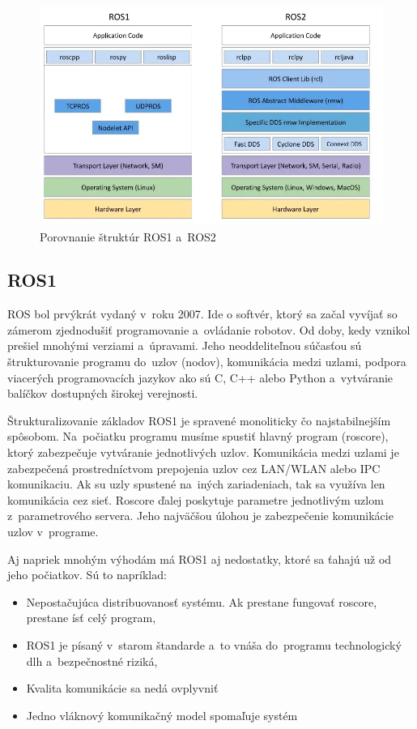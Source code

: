 \begin{figure}[!htbp]
	\centering
	\includegraphics[width=15cm]{img/strukturaRos1Ros2.png}
	\caption{Porovnanie štruktúr ROS1 a~ROS2~\cite{comparison}}
	\label{fig:struktury}
\end{figure}

\pagebreak

\subsection{ROS1}

\noindent ROS bol prvýkrát vydaný v~roku 2007. Ide o softvér, ktorý sa začal vyvíjať so zámerom zjednodušiť programovanie a~ovládanie robotov. Od doby,
kedy vznikol prešiel mnohými verziami a~úpravami. Jeho neoddeliteľnou súčasťou sú štrukturovanie programu do~uzlov (nodov), komunikácia medzi uzlami,
podpora viacerých programovacích jazykov ako sú C, C++ alebo Python a~vytváranie balíčkov dostupných širokej verejnosti.

Štrukturalizovanie základov ROS1 je spravené monoliticky čo najstabilnejším spôsobom. Na~počiatku programu musíme spustiť hlavný program (roscore),
ktorý zabezpečuje vytváranie jednotlivých uzlov. Komunikácia medzi uzlami je zabezpečená prostredníctvom prepojenia uzlov cez LAN/WLAN alebo IPC komunikaciu.
Ak su uzly spustené na~iných zariadeniach, tak sa využíva len komunikácia cez sieť. Roscore ďalej poskytuje parametre jednotlivým uzlom z~parametrového
servera. Jeho najväčšou úlohou je zabezpečenie komunikácie uzlov v~programe.

\pagebreak

Aj napriek mnohým výhodám má ROS1 aj nedostatky, ktoré sa ťahajú už od jeho počiatkov. Sú to napríklad:
\begin{itemize}
	\item Nepostačujúca distribuovanosť systému. Ak prestane fungovať roscore, prestane ísť celý program,
	\item ROS1 je písaný v~starom štandarde a~to vnáša do~programu technologický dlh a~bezpečnostné riziká,
	\item Kvalita komunikácie sa nedá ovplyvniť
	\item Jedno vláknový komunikačný model spomaľuje systém
\end{itemize}

